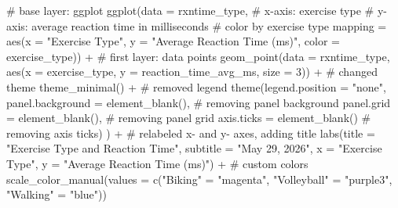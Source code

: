 \documentclass[
  letterpaper,
  DIV=11,
  numbers=noendperiod]{scrartcl}
\newenvironment{Shaded}{\begin{snugshade}}{\end{snugshade}}
\newcommand{\AttributeTok}[1]{\textcolor[rgb]{0.40,0.45,0.13}{#1}}
\newcommand{\CommentTok}[1]{\textcolor[rgb]{0.37,0.37,0.37}{#1}}
\newcommand{\DecValTok}[1]{\textcolor[rgb]{0.68,0.00,0.00}{#1}}
\newcommand{\FunctionTok}[1]{\textcolor[rgb]{0.28,0.35,0.67}{#1}}
\newcommand{\NormalTok}[1]{\textcolor[rgb]{0.00,0.23,0.31}{#1}}
\newcommand{\OtherTok}[1]{\textcolor[rgb]{0.00,0.23,0.31}{#1}}
\newcommand{\SpecialCharTok}[1]{\textcolor[rgb]{0.37,0.37,0.37}{#1}}
\newcommand{\StringTok}[1]{\textcolor[rgb]{0.13,0.47,0.30}{#1}}
\newcounter{none} %
\begin{document}
\begin{Shaded}
\begin{Highlighting}[]
\CommentTok{\# base layer: ggplot}
\FunctionTok{ggplot}\NormalTok{(}\AttributeTok{data =}\NormalTok{ rxntime\_type,}
       \CommentTok{\# x{-}axis: exercise type}
       \CommentTok{\# y{-}axis: average reaction time in milliseconds}
       \CommentTok{\# color by exercise type}
       \AttributeTok{mapping =} \FunctionTok{aes}\NormalTok{(}\AttributeTok{x =} \StringTok{"Exercise Type"}\NormalTok{,}
                     \AttributeTok{y =} \StringTok{"Average Reaction Time (ms)"}\NormalTok{,}
                     \AttributeTok{color =}\NormalTok{ exercise\_type)) }\SpecialCharTok{+}
  \CommentTok{\# first layer: data points}
  \FunctionTok{geom\_point}\NormalTok{(}\AttributeTok{data =}\NormalTok{ rxntime\_type,}
             \FunctionTok{aes}\NormalTok{(}\AttributeTok{x =}\NormalTok{ exercise\_type,}
                 \AttributeTok{y =}\NormalTok{ reaction\_time\_avg\_ms,}
                 \AttributeTok{size =} \DecValTok{3}\NormalTok{)) }\SpecialCharTok{+}
  \CommentTok{\# changed theme}
  \FunctionTok{theme\_minimal}\NormalTok{() }\SpecialCharTok{+}
  \CommentTok{\# removed legend}
  \FunctionTok{theme}\NormalTok{(}\AttributeTok{legend.position =} \StringTok{"none"}\NormalTok{,}
        \AttributeTok{panel.background =} \FunctionTok{element\_blank}\NormalTok{(), }\CommentTok{\# removing panel background}
        \AttributeTok{panel.grid =} \FunctionTok{element\_blank}\NormalTok{(), }\CommentTok{\# removing panel grid}
        \AttributeTok{axis.ticks =} \FunctionTok{element\_blank}\NormalTok{() }\CommentTok{\# removing axis ticks)}
\NormalTok{  ) }\SpecialCharTok{+}
  \CommentTok{\# relabeled x{-} and y{-} axes, adding title}
  \FunctionTok{labs}\NormalTok{(}\AttributeTok{title =} \StringTok{"Exercise Type and Reaction Time"}\NormalTok{,}
       \AttributeTok{subtitle =} \StringTok{"May 29, 2026"}\NormalTok{,}
       \AttributeTok{x =} \StringTok{"Exercise Type"}\NormalTok{,}
       \AttributeTok{y =} \StringTok{"Average Reaction Time (ms)"}\NormalTok{) }\SpecialCharTok{+}
  \CommentTok{\# custom colors}
  \FunctionTok{scale\_color\_manual}\NormalTok{(}\AttributeTok{values =}
                       \FunctionTok{c}\NormalTok{(}\StringTok{"Biking"} \OtherTok{=} \StringTok{"magenta"}\NormalTok{,}
                         \StringTok{"Volleyball"} \OtherTok{=} \StringTok{"purple3"}\NormalTok{,}
                         \StringTok{"Walking"} \OtherTok{=} \StringTok{"blue"}\NormalTok{))}
\end{Highlighting}
\end{Shaded}
\end{document}
